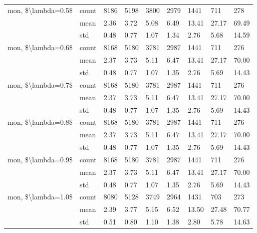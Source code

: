 \begin{tabular}{lllllllll}
mon, \$\textbackslash lambda=0.5\$ & count &  8186 &   5198 &   3800 &   2979 &   1441 &     711 &     278 \\
                   & mean &  2.36 &   3.72 &   5.08 &   6.49 &  13.41 &   27.17 &   69.49 \\
                   & std &  0.48 &   0.77 &   1.07 &   1.34 &   2.76 &    5.68 &   14.59 \\
mon, \$\textbackslash lambda=0.6\$ & count &  8168 &   5180 &   3781 &   2987 &   1441 &     711 &     276 \\
                   & mean &  2.37 &   3.73 &   5.11 &   6.47 &  13.41 &   27.17 &   70.00 \\
                   & std &  0.48 &   0.77 &   1.07 &   1.35 &   2.76 &    5.69 &   14.43 \\
mon, \$\textbackslash lambda=0.7\$ & count &  8168 &   5180 &   3781 &   2987 &   1441 &     711 &     276 \\
                   & mean &  2.37 &   3.73 &   5.11 &   6.47 &  13.41 &   27.17 &   70.00 \\
                   & std &  0.48 &   0.77 &   1.07 &   1.35 &   2.76 &    5.69 &   14.43 \\
mon, \$\textbackslash lambda=0.8\$ & count &  8168 &   5180 &   3781 &   2987 &   1441 &     711 &     276 \\
                   & mean &  2.37 &   3.73 &   5.11 &   6.47 &  13.41 &   27.17 &   70.00 \\
                   & std &  0.48 &   0.77 &   1.07 &   1.35 &   2.76 &    5.69 &   14.43 \\
mon, \$\textbackslash lambda=0.9\$ & count &  8168 &   5180 &   3781 &   2987 &   1441 &     711 &     276 \\
                   & mean &  2.37 &   3.73 &   5.11 &   6.47 &  13.41 &   27.17 &   70.00 \\
                   & std &  0.48 &   0.77 &   1.07 &   1.35 &   2.76 &    5.69 &   14.43 \\
mon, \$\textbackslash lambda=1.0\$ & count &  8080 &   5128 &   3749 &   2964 &   1431 &     703 &     273 \\
                   & mean &  2.39 &   3.77 &   5.15 &   6.52 &  13.50 &   27.48 &   70.77 \\
                   & std &  0.51 &   0.80 &   1.10 &   1.38 &   2.80 &    5.78 &   14.63 \\
\bottomrule
\end{tabular}
